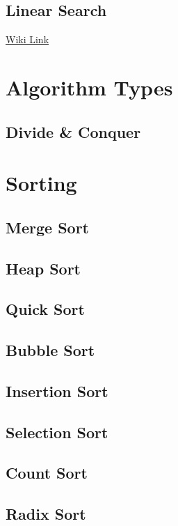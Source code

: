 \subsection{Linear Search}

\href{https://en.wikipedia.org/wiki/Linear_search}{Wiki Link}

\section{Algorithm Types}
\subsection{Divide \& Conquer}

\section{Sorting}
\subsection{Merge Sort}
\subsection{Heap Sort}
\subsection{Quick Sort}
\subsection{Bubble Sort}
\subsection{Insertion Sort}
\subsection{Selection Sort}
\subsection{Count Sort}
\subsection{Radix Sort}
